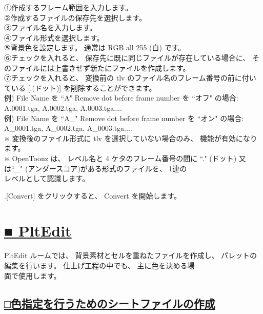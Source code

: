 \documentclass[a4paper,10pt]{article}
\begin{document}
\footnotesize
\noindent ①作成するフレーム範囲を入力します。\\
②作成するファイルの保存先を選択します。\\
③ファイル名を入力します。\\
④ファイル形式を選択します。\\
⑤背景色を設定します。 通常は RGB all 255 (白) です。\\
⑥チェックを入れると、 保存先に既に同じファイルが存在している場合に、 そのファイルには上書きせず新たにファイルを作成します。\\
⑦チェックを入れると、 変換前の tlv のファイル名のフレーム番号の前に付いている [.(ドット)] を削除することができます。\\
例) File Name を “A" Remove dot before frame number を “オフ" の場合: A.0001.tga, A.0002.tga, A.0003.tga....\\
例) File Name を “A\_" Remove dot before frame number を “オン" の場合: A\_0001.tga, A\_0002.tga, A\_0003.tga....\\
※ 変換後のファイル形式に tlv を選択していない場合のみ、 機能が有効になります。\\
※ OpenToonz は、 レベル名と 4 ケタのフレーム番号の間に “." (ドット) 又は“\_" (アンダースコア)がある形式のファイルを、 1連の\\
レベルとして認識します。\\
\par
\normalsize
{}.[Convert] をクリックすると、 Convert を開始します。

\newpage

\section*{\uline{■ PltEdit}}

\footnotesize
\noindent PltEdit ルームでは、 背景素材とセルを重ねたファイルを作成し、 パレットの編集を行います。 仕上げ工程の中でも、 主に色を決める場\\
面で使用します。\\

\subsection*{\uline{□色指定を行うためのシートファイルの作成}}
\end{document}
